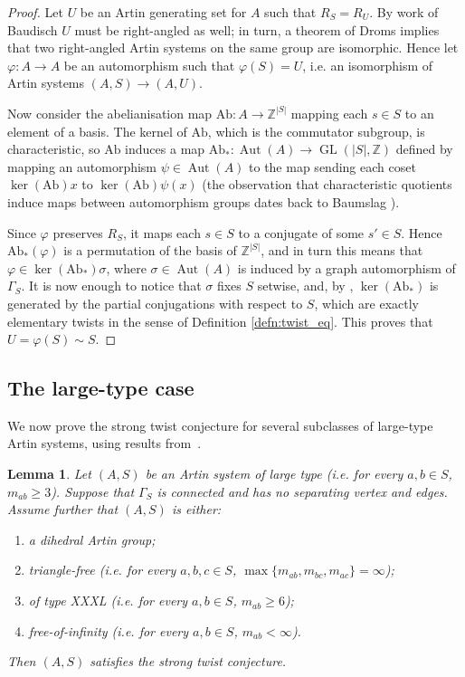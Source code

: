 \documentclass[svgnames]{amsart}
\theoremstyle{plain}
\newtheorem{lemma}[thm]{Lemma}
\theoremstyle{definition}
\newcommand{\aut}[1]{\operatorname{Aut}(#1)}
\renewcommand{\phi}{\varphi}
\begin{document}
\begin{proof}
Let $U$ be an Artin generating set for $A$ such that $R_S=R_U$. By work of Baudisch \cite{baudisch1981raagcharacterise} $U$ must be right-angled as well; in turn, a theorem of Droms \cite{droms1987isomorphisms} implies that two right-angled Artin systems on the same group are isomorphic. Hence let $\phi\colon A\to A$ be an automorphism such that $\phi(S)=U$, i.e. an isomorphism of Artin systems $(A,S)\to(A,U)$.


Now consider the abelianisation map $\mathrm{Ab}: A \rightarrow \mathbb{Z}^{|S|}$ mapping each $s\in S$ to an element of a basis. The kernel of $\mathrm{Ab}$, which is the commutator subgroup, is characteristic, so $\mathrm{Ab}$ induces a map $\mathrm{Ab}_*: \aut{A} \rightarrow \operatorname{GL}(|S|, \mathbb{Z})$ defined by mapping an automorphism $\psi\in \aut{A}$ to the map sending each coset $\ker(\mathrm{Ab}) x$ to $\ker(\mathrm{Ab}) \psi(x)$ (the observation that characteristic quotients induce maps between automorphism groups dates back to Baumslag \cite{Baumslag}). 

Since $\phi$ preserves $R_S$, it maps each $s\in S$ to a conjugate of some $s'\in S$. Hence $\mathrm{Ab}_*(\phi)$ is a permutation of the basis of $\mathbb{Z}^{|S|}$, and in turn this means that $\phi\in \ker(\mathrm{Ab}_*) \sigma$, where $\sigma\in\aut{A}$ is induced by a graph automorphism of $\Gamma_S$. It is now enough to notice that $\sigma$ fixes $S$ setwise, and, by \cite[Theorem 2.2]{laurence1995generating}, $\ker(\mathrm{Ab}_*)$ is generated by the partial conjugations with respect to $S$, which are exactly elementary twists in the sense of Definition \ref{defn:twist_eq}. This proves that $U=\phi(S)\sim S$. 
\end{proof}

\subsection{The large-type case}
We now prove the strong twist conjecture for several subclasses of large-type Artin systems, using results from~\cite{crisp2005automorphisms,BMV,Vaskou_LTFOI}.



\begin{lemma}\label{lem:strong_large}
Let $(A,S)$ be an Artin system of large type (i.e. for every $a,b\in S$, $m_{ab}\ge3$). Suppose that $\Gamma_S$ is connected and has no separating vertex and edges. Assume further that $(A,S)$ is either:
\begin{enumerate}
\item\label{item:dihedral} a dihedral Artin group;
\item\label{item:triangle-free} triangle-free (i.e. for every $a,b,c\in S$, $\max\{m_{ab},m_{bc},m_{ac}\}=\infty$);
\item\label{item:XXXL} of type XXXL (i.e. for every $a,b\in S$, $m_{ab}\ge6$);
\item\label{item:foi} free-of-infinity (i.e. for every $a,b\in S$, $m_{ab}<\infty$).
\end{enumerate}
Then $(A,S)$ satisfies the strong twist conjecture.
\end{lemma}
\end{document}
